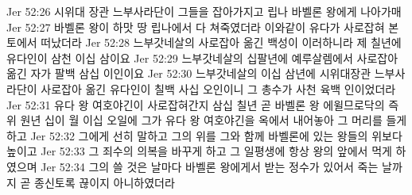 Jer 52:26  시위대 장관 느부사라단이 그들을 잡아가지고 립나 바벨론 왕에게 나아가매
Jer 52:27  바벨론 왕이 하맛 땅 립나에서 다 쳐죽였더라 이와같이 유다가 사로잡혀 본토에서 떠났더라
Jer 52:28  느부갓네살의 사로잡아 옮긴 백성이 이러하니라 제 칠년에 유다인이 삼천 이십 삼이요
Jer 52:29  느부갓네살의 십팔년에 예루살렘에서 사로잡아 옮긴 자가 팔백 삼십 이인이요
Jer 52:30  느부갓네살의 이십 삼년에 시위대장관 느부사라단이 사로잡아 옮긴 유다인이 칠백 사십 오인이니 그 총수가 사천 육백 인이었더라
Jer 52:31  유다 왕 여호야긴이 사로잡혀간지 삼십 칠년 곧 바벨론 왕 에윌므로닥의 즉위 원년 십이 월 이십 오일에 그가 유다 왕 여호야긴을 옥에서 내어놓아 그 머리를 들게 하고
Jer 52:32  그에게 선히 말하고 그의 위를 그와 함께 바벨론에 있는 왕들의 위보다 높이고
Jer 52:33  그 죄수의 의복을 바꾸게 하고 그 일평생에 항상 왕의 앞에서 먹게 하였으며
Jer 52:34  그의 쓸 것은 날마다 바벨론 왕에게서 받는 정수가 있어서 죽는 날까지 곧 종신토록 끊이지 아니하였더라


